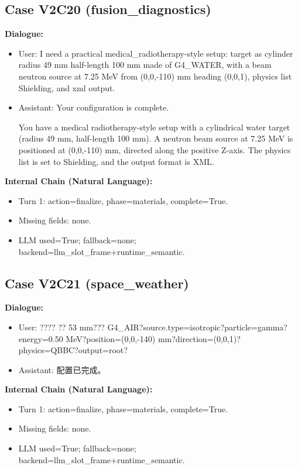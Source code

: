 \documentclass[11pt]{ctexart}
\begin{document}
\subsection{Case V2C20 (fusion\_diagnostics)}
\textbf{Dialogue:}
\begin{itemize}
\item User: I need a practical medical\_radiotherapy-style setup: target as cylinder radius 49 mm half-length 100 mm made of G4\_WATER, with a beam neutron source at 7.25 MeV from (0,0,-110) mm heading (0,0,1), physics list Shielding, and xml output.
\item Assistant: Your configuration is complete.

You have a medical radiotherapy-style setup with a cylindrical water target (radius 49 mm, half-length 100 mm). A neutron beam source at 7.25 MeV is positioned at (0,0,-110) mm, directed along the positive Z-axis. The physics list is set to Shielding, and the output format is XML.
\end{itemize}
\textbf{Internal Chain (Natural Language):}
\begin{itemize}
\item Turn 1: action=finalize, phase=materials, complete=True.
\item Missing fields: none.
\item LLM used=True; fallback=none; backend=llm\_slot\_frame+runtime\_semantic.
\end{itemize}
\subsection{Case V2C21 (space\_weather)}
\textbf{Dialogue:}
\begin{itemize}
\item User: ???? ?? 53 mm??? G4\_AIR?source.type=isotropic?particle=gamma?energy=0.50 MeV?position=(0,0,-140) mm?direction=(0,0,1)?physics=QBBC?output=root?
\item Assistant: 配置已完成。
\end{itemize}
\textbf{Internal Chain (Natural Language):}
\begin{itemize}
\item Turn 1: action=finalize, phase=materials, complete=True.
\item Missing fields: none.
\item LLM used=True; fallback=none; backend=llm\_slot\_frame+runtime\_semantic.
\end{itemize}
\end{document}
